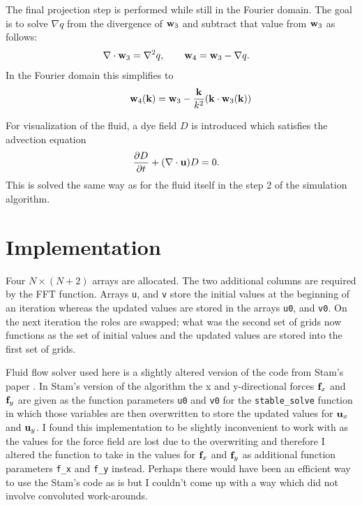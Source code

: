 \documentclass[12pt, letterpaper]{article}
\begin{document}
The final projection step is performed while still in the Fourier domain.
The goal is to solve $\nabla q$ from the divergence of $\vb{w}_{3}$ and subtract that value from $\vb{w}_{3}$ as follows:
\begin{align*}
  \nabla \cdot \vb{w}_{3}&=\nabla^{2}q  ,\qquad \vb{w}_{4} = \vb{w}_{3}-\nabla q.
\end{align*}
In the Fourier domain this simplifies to
\begin{align*}
  \qquad \vb{w}_{4}(\vb{k}) = \vb{w}_{3}- \frac{\vb{k}}{k^{2}}(\vb{k}\cdot\vb{w}_{3}(\vb{k}))
\end{align*}

For visualization of the fluid, a dye field $D$ is introduced which satisfies the advection equation
\begin{align*}
  \frac{\partial{D}}{\partial t} + (\nabla\cdot\vb{u})D &= 0.
\end{align*}
This is solved the same way as for the fluid itself in the step 2 of the simulation algorithm.

\section{Implementation}
Four $N\times (N+2)$ arrays are allocated.
The two additional columns are required by the FFT function.
Arrays \verb|u|, and \verb|v| store the initial values at the beginning of an iteration whereas the updated values are stored in the arrays \verb|u0|, and \verb|v0|.
On the next iteration the roles are swapped; what was the second set of grids now functions as the set of initial values and the updated values are stored into the first set of grids.

Fluid flow solver used here is a slightly altered version of the code from Stam's paper \cite{Stam1}.
In Stam's version of the algorithm the x and y-directional forces $\vb{f}_{x}$ and $\vb{f}_{y}$ are given as the function parameters \verb|u0| and \verb|v0| for the \verb|stable_solve| function in which those variables are then overwritten to store the updated values for $\vb{u}_{x}$ and $\vb{u}_{y}$.
I found this implementation to be slightly inconvenient to work with as the values for the force field are lost due to the overwriting and therefore I altered the function to take in the values for $\vb{f}_{x}$ and $\vb{f}_{y}$ as additional function parameters \verb|f_x| and \verb|f_y| instead.
Perhaps there would have been an efficient way to use the Stam's code as is but I couldn't come up with a way which did not involve convoluted work-arounds.
\end{document}
